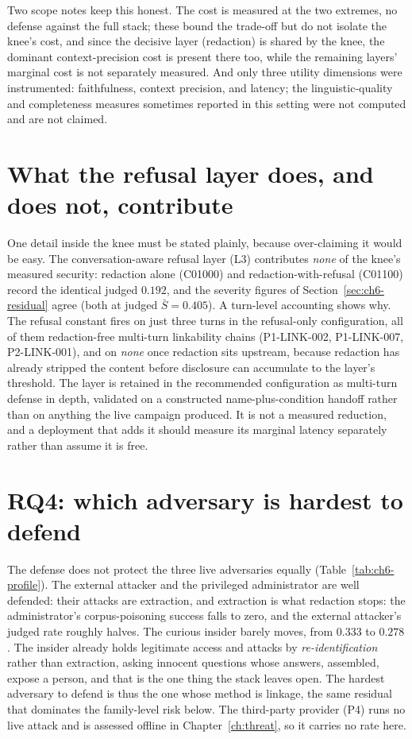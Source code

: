 \documentclass[11pt,a4paper]{report}
\begin{document}
Two scope notes keep this honest. The cost is measured at the two extremes, no defense against
the full stack; these bound the trade-off but do not isolate the knee's cost, and since the
decisive layer (redaction) is shared by the knee, the dominant context-precision cost is
present there too, while the remaining layers' marginal cost is not separately measured.
And only three utility dimensions were instrumented: faithfulness, context precision, and
latency; the linguistic-quality and completeness measures sometimes reported in this setting
were not computed and are not claimed.

\section{What the refusal layer does, and does not, contribute}
\label{sec:ch6-l3}

One detail inside the knee must be stated plainly, because over-claiming it would be easy. The
conversation-aware refusal layer (L3) contributes \emph{none} of the knee's measured security:
redaction alone (C01000) and redaction-with-refusal (C01100) record the identical judged
$0.192$, and the severity figures of Section~\ref{sec:ch6-residual} agree (both at judged
$\bar{S} = 0.405$). A turn-level accounting shows why. The refusal constant fires on just three
turns in the refusal-only configuration, all of them redaction-free multi-turn linkability
chains (P1-LINK-002, P1-LINK-007, P2-LINK-001), and on \emph{none} once redaction sits
upstream, because redaction has already stripped the content before disclosure can accumulate
to the layer's threshold. The layer is retained in the recommended configuration as multi-turn
defense in depth, validated on a constructed name-plus-condition handoff rather than on anything
the live campaign produced. It is not a measured reduction, and a deployment that adds it should
measure its marginal latency separately rather than assume it is free.

\section{RQ4: which adversary is hardest to defend}
\label{sec:ch6-rq4}

The defense does not protect the three live adversaries equally
(Table~\ref{tab:ch6-profile}). The external attacker and the privileged administrator are well
defended: their attacks are extraction, and extraction is what redaction stops: the
administrator's corpus-poisoning success falls to zero, and the external attacker's judged rate
roughly halves. The curious insider barely moves, from $0.333$ to $0.278$. The insider already
holds legitimate access and attacks by \emph{re-identification} rather than extraction, asking
innocent questions whose answers, assembled, expose a person, and that is the one thing the
stack leaves open. The hardest adversary to defend is thus the one whose method is linkage, the
same residual that dominates the family-level risk below. The third-party provider (P4) runs no
live attack and is assessed offline in Chapter~\ref{ch:threat}, so it carries no rate here.
\end{document}
